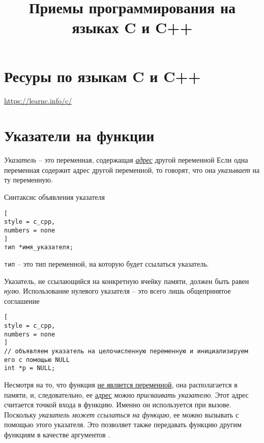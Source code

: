 \documentclass[%
	11pt,
	a4paper,
	utf8,
		]{article}
\begin{document}
\title{Приемы программирования на языках C и C++}

\author{}

\date{}
\maketitle

\thispagestyle{fancy}

\tableofcontents

\section{Ресуры по языкам C и C++}

\url{https://learnc.info/c/}

\section{Указатели на функции}

\emph{Указатель} -- это переменная, содержащая \underline{\itshape адрес} другой переменной  Если одна переменная содержит {адрес} другой переменной, то говорят, что она \emph{указывает} на ту переменную\cite[]{koltzov-c-lang:2019}.

Синтаксис объявления указателя
\begin{lstlisting}[
style = c_cpp,
numbers = none
]
тип *имя_указателя;
\end{lstlisting}

\texttt{тип} -- это тип переменной, на которую будет ссылаться указатель.

Указатель, не ссылающийся на конкретную ячейку памяти, должен быть равен \emph{нулю}. Использование нулевого указателя -- это всего лишь общепринятое соглашение
\begin{lstlisting}[
style = c_cpp,
numbers = none
]
// объявляем указатель на целочисленную переменную и инициализируем его с помощью NULL
int *p = NULL; 
\end{lstlisting}


Несмотря на то, что функция \underline{не является переменной}, она располагается в памяти, и, следовательно, ее \underline{адрес} можно \emph{присваивать указателю}. Этот адрес считается точкой входа в функцию. Именно он используется при вызове. Поскольку \emph{указатель может ссылаться на функцию}, ее можно вызывать с помощью этого указателя. Это позволяет также передавать функцию другим функциям в качестве аргументов \cite{koltzov-c-lang:2019}.
\end{document}
